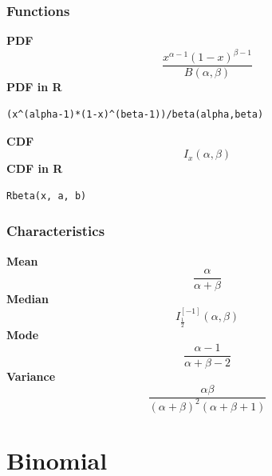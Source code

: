 \subsubsection*{Functions}

\smallskip \noindent \hspace{.2cm} \textbf{PDF} 
\begin{equation*}\frac{x^{\alpha-1}(1-x)^{\beta-1}} {B(\alpha,\beta)} \end{equation*}
\smallskip \noindent \hspace{.2cm} \textbf{PDF in R}  
\begin{verbatim}(x^(alpha-1)*(1-x)^(beta-1))/beta(alpha,beta)\end{verbatim}
\smallskip \noindent \hspace{.2cm} \textbf{CDF} 
\begin{equation*}I_x(\alpha,\beta)\end{equation*}
\smallskip \noindent \hspace{.2cm} \textbf{CDF in R} 
\begin{verbatim}Rbeta(x, a, b)\end{verbatim}
\smallskip
\subsubsection*{Characteristics}
\smallskip \noindent \hspace{.2cm} \textbf{Mean} 
\begin{equation*}\frac{\alpha}{\alpha+\beta}\end{equation*}
\smallskip \noindent \hspace{.2cm} \textbf{Median} 
\begin{equation*}I_{\frac{1}{2}}^{[-1]}(\alpha,\beta)\end{equation*}
\smallskip \noindent \hspace{.2cm} \textbf{Mode} 
\begin{equation*}\frac{\alpha-1}{\alpha+\beta-2}\end{equation*}
\smallskip \noindent \hspace{.2cm} \textbf{Variance} 
\begin{equation*}\frac{\alpha\beta}{(\alpha+\beta)^2(\alpha+\beta+1)}\end{equation*}
\smallskip
\section*{Binomial} 

  \bigskip 

